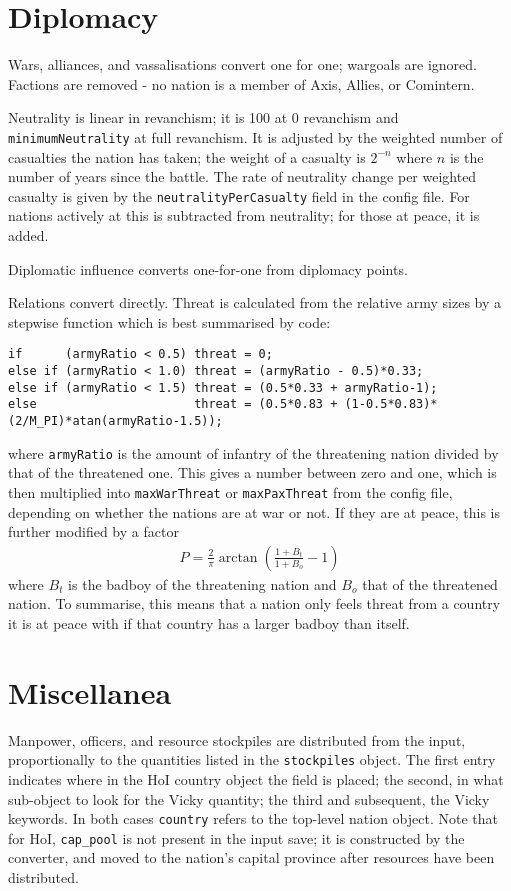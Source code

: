 \documentclass[12pt,ebook,oneside]{book}
\begin{document}
\section{Diplomacy}

Wars, alliances, and vassalisations convert one for one; wargoals are
ignored. Factions are removed - no nation is a member of Axis, Allies, or
Comintern. 

Neutrality is linear in revanchism; it is 100 at 0 revanchism and
\texttt{minimumNeutrality} at full revanchism. It is adjusted by the
weighted number of casualties the nation has taken; the weight of a
casualty is $2^{-n}$ where $n$ is the number of years since the
battle. The rate of neutrality change per weighted casualty is given by
the \texttt{neutralityPerCasualty} field in the config file. For
nations actively at this is subtracted from neutrality; for those at
peace, it is added. 

Diplomatic influence converts one-for-one from diplomacy points. 

Relations convert directly. Threat is calculated from the relative
army sizes by a stepwise function which is best summarised by code:
\begin{verbatim}
if      (armyRatio < 0.5) threat = 0;
else if (armyRatio < 1.0) threat = (armyRatio - 0.5)*0.33;
else if (armyRatio < 1.5) threat = (0.5*0.33 + armyRatio-1);
else                      threat = (0.5*0.83 + (1-0.5*0.83)*(2/M_PI)*atan(armyRatio-1.5));
\end{verbatim}
where \texttt{armyRatio} is the amount of infantry of the threatening
nation divided by that of the threatened one. This gives a number
between zero and one, which is then multiplied into
\texttt{maxWarThreat} or \texttt{maxPaxThreat} from the config
file, depending on whether the nations are at war or not. If they are
at peace, this is further modified by a factor
\begin{eqnarray*}
P = \frac{2}{\pi}\arctan\left(\frac{1+B_t}{1+B_o}-1\right)
\end{eqnarray*}
where $B_t$ is the badboy of the threatening nation and $B_o$ that of
the threatened nation. To summarise, this means that a nation only
feels threat from a country it is at peace with if that country has a
larger badboy than itself.

\section{Miscellanea}

Manpower, officers, and resource stockpiles are distributed 
from the input, proportionally to the quantities listed in the
\texttt{stockpiles} object. The first entry indicates where in the HoI
country object the field is placed; the second, in what sub-object to
look for the Vicky quantity; the third and subsequent, the Vicky keywords. In both
cases \texttt{country} refers to the top-level nation
object. Note that for HoI, \texttt{cap\_pool} is not present in the
input save; it is constructed by the converter, and moved to the
nation's capital province after resources have been distributed. 
\end{document}
